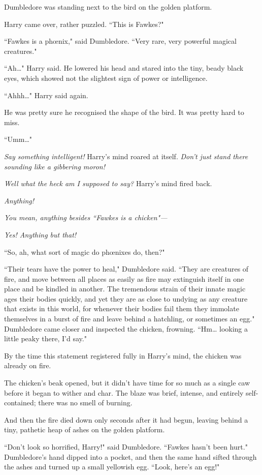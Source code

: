 Dumbledore was standing next to the bird on the golden platform.

Harry came over, rather puzzled. ``This is Fawkes?"

``Fawkes is a phœnix," said Dumbledore. ``Very rare, very powerful magical creatures."

``Ah{\ldots}" Harry said. He lowered his head and stared into the tiny, beady black eyes, which showed not the slightest sign of power or intelligence.

``Ahhh{\ldots}" Harry said again.

He was pretty sure he recognised the shape of the bird. It was pretty hard to miss.

``Umm{\ldots}"

\emph{Say something intelligent!} Harry's mind roared at itself. \emph{Don't just stand there sounding like a gibbering moron!}

\emph{Well what the heck am I \emph{supposed} to say?} Harry's mind fired back.

\emph{Anything!}

\emph{You mean, anything besides ``Fawkes is a chicken"—}

\emph{Yes! Anything but that!}

``So, ah, what sort of magic do phœnixes do, then?"

``Their tears have the power to heal," Dumbledore said. ``They are creatures of fire, and move between all places as easily as fire may extinguish itself in one place and be kindled in another. The tremendous strain of their innate magic ages their bodies quickly, and yet they are as close to undying as any creature that exists in this world, for whenever their bodies fail them they immolate themselves in a burst of fire and leave behind a hatchling, or sometimes an egg." Dumbledore came closer and inspected the chicken, frowning. ``Hm{\ldots} looking a little peaky there, I'd say."

By the time this statement registered fully in Harry's mind, the chicken was already on fire.

The chicken's beak opened, but it didn't have time for so much as a single caw before it began to wither and char. The blaze was brief, intense, and entirely self-contained; there was no smell of burning.

And then the fire died down only seconds after it had begun, leaving behind a tiny, pathetic heap of ashes on the golden platform.

``Don't look so horrified, Harry!" said Dumbledore. ``Fawkes hasn't been hurt." Dumbledore's hand dipped into a pocket, and then the same hand sifted through the ashes and turned up a small yellowish egg. ``Look, here's an egg!"

